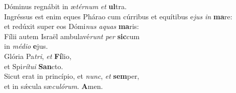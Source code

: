 \evenverse Dóminus regnábit in æ\textit{tér}\textit{num} \textit{et} \textbf{ul}tra.\\
\oddverse Ingréssus est enim eques Phárao cum cúrribus et equítibus e\textit{jus} \textit{in} \textbf{ma}re:~\*\\
\oddverse et redúxit super eos Dómi\textit{nus} \textit{a}\textit{quas} \textbf{ma}ris:\\
\evenverse Fílii autem Israël ambulavé\textit{runt} \textit{per} \textbf{sic}cum~\*\\
\evenverse in \textit{mé}\textit{di}\textit{o} \textbf{e}jus.\\
\oddverse Glória Pa\textit{tri}, \textit{et} \textbf{Fí}lio,~\*\\
\oddverse et Spi\textit{rí}\textit{tu}\textit{i} \textbf{San}cto.\\
\evenverse Sicut erat in princípio, et \textit{nunc}, \textit{et} \textbf{sem}per,~\*\\
\evenverse et in sǽcula sæ\textit{cu}\textit{ló}\textit{rum}. \textbf{A}men.\\
